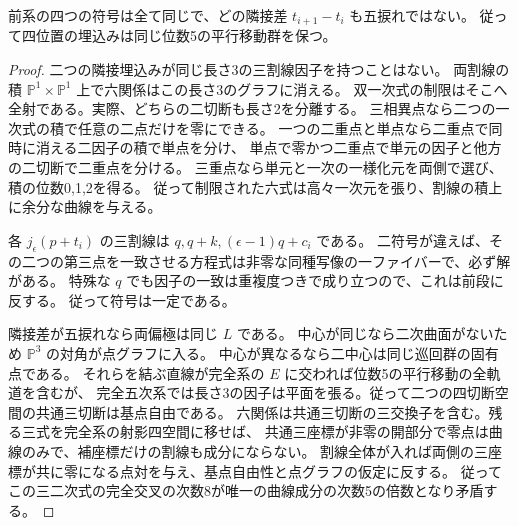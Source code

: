 \begin{corollary}\label{cor:quintic-same-center-type}
前系の四つの符号は全て同じで、どの隣接差 $t_{i+1}-t_i$ も五捩れではない。
従って四位置の埋込みは同じ位数5の平行移動群を保つ。
\end{corollary}
\begin{proof}
二つの隣接埋込みが同じ長さ3の三割線因子を持つことはない。
両割線の積 $\mathbb P^1\times\mathbb P^1$ 上で六関係はこの長さ3のグラフに消える。
双一次式の制限はそこへ全射である。実際、どちらの二切断も長さ2を分離する。
三相異点なら二つの一次式の積で任意の二点だけを零にできる。
一つの二重点と単点なら二重点で同時に消える二因子の積で単点を分け、
単点で零かつ二重点で単元の因子と他方の二切断で二重点を分ける。
三重点なら単元と一次の一様化元を両側で選び、積の位数0,1,2を得る。
従って制限された六式は高々一次元を張り、割線の積上に余分な曲線を与える。

各 $j_\epsilon(p+t_i)$ の三割線は $q,q+k,(\epsilon-1)q+c_i$ である。
二符号が違えば、その二つの第三点を一致させる方程式は非零な同種写像の一ファイバーで、必ず解がある。
特殊な $q$ でも因子の一致は重複度つきで成り立つので、これは前段に反する。
従って符号は一定である。

隣接差が五捩れなら両偏極は同じ $L$ である。
中心が同じなら二次曲面がないため $\mathbb P^3$ の対角が点グラフに入る。
中心が異なるなら二中心は同じ巡回群の固有点である。
それらを結ぶ直線が完全系の $E$ に交われば位数5の平行移動の全軌道を含むが、
完全五次系では長さ3の因子は平面を張る。従って二つの四切断空間の共通三切断は基点自由である。
六関係は共通三切断の三交換子を含む。残る三式を完全系の射影四空間に移せば、
共通三座標が非零の開部分で零点は曲線のみで、補座標だけの割線も成分にならない。
割線全体が入れば両側の三座標が共に零になる点対を与え、基点自由性と点グラフの仮定に反する。
従ってこの三二次式の完全交叉の次数8が唯一の曲線成分の次数5の倍数となり矛盾する。
\end{proof}
